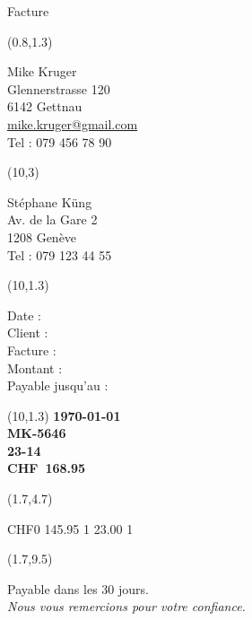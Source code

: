 \documentclass[a4paper,12pt]{letter}
\makeatletter
\newenvironment{calibri}{\mymainfont}{}
\newcommand{\thedate}{\today}
\newcommand{\thefinaldate}{\DayAfter[30]}
\newcommand\francs{168}
\newcommand\cents{95}
\newcommand\clientid{MK-5646}
\newcommand\invoiceid{23-14}
\newcommand\currencycode{CHF}
\newcommand\mycompanyname{Mike Kruger\\Glennerstrasse 120\\6142 Gettnau\\\href{mailto:mike.kruger@gmail.com}{mike.kruger@gmail.com}\\Tel : 079 456 78 90}
\newcommand\clientname{Stéphane Küng\\Av. de la Gare 2\\1208 Genève\\Tel : 079 123 44 55\\}
\makeatother
\begin{document}
\begin{calibri}
{\huge Facture}

\begin{textblock}{12.6}(0.8,1.3)
\raggedright
{\small \mycompanyname}
\end{textblock}

\begin{textblock}{12.6}(10,3)
\raggedright
{\large \clientname}
\end{textblock}

\begin{textblock}{4}(10,1.3)
\raggedright
{\small 
Date :  \\
Client : \\
Facture : \\
Montant : \\
Payable jusqu'au :
}
\end{textblock}

\begin{textblock}{4}(10,1.3)
\raggedleft
{\small 
\textbf{\thedate}\\
\textbf{\clientid}\\
\textbf{\invoiceid}\\
\textbf{\currencycode\ \francs.\cents}\\
\textbf{\thefinaldate}}
\end{textblock}

\begin{textblock}{12.6}(1.7,4.7)
 \begin{invoice}{\currencycode}{0}
       {145.95} {1}
       {23.00} {1}
    \end{invoice}
\end{textblock}

\begin{textblock}{12.6}(1.7,9.5)
\raggedright
Payable dans les 30 jours.\\
\textit{Nous vous remercions pour votre confiance.}
\end{textblock}

\end{calibri}   
\end{document}
